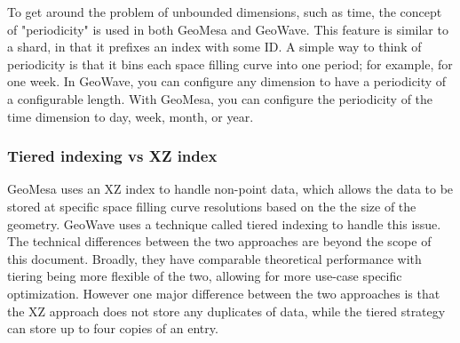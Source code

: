 To get around the problem of unbounded dimensions, such as time, the concept of "periodicity" is used in both GeoMesa and GeoWave.
This feature is similar to a shard, in that it prefixes an index with some ID.
A simple way to think of periodicity is that it bins each space filling curve into one period; for example, for one week.
In GeoWave, you can configure any dimension to have a periodicity of a configurable length.
With GeoMesa, you can configure the periodicity of the time dimension to day, week, month, or year.


\subsubsection{Tiered indexing vs XZ index}
\label{sec:featurecompare:indexing:versus}

GeoMesa uses an XZ index to handle non-point data, which allows the data to be stored at specific space filling curve resolutions based on the the size of the geometry.
GeoWave uses a technique called tiered indexing to handle this issue.
The technical differences between the two approaches are beyond the scope of this document.
Broadly, they have comparable theoretical performance with tiering being more flexible of the two, allowing for more use-case specific optimization.
However one major difference between the two approaches is that the XZ approach does not store any duplicates of data, while the tiered strategy can store up to four copies of an entry.
